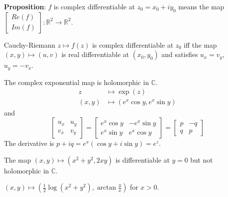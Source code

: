 \documentclass{report}
\begin{document}
\textbf{Proposition}: $f$ is complex differentiable at $z_{0} = x_{0} + iy_{0}$ means the map $\begin{bmatrix}
    Re(f) \\
    Im(f)   
\end{bmatrix} : \mathbb{R}^{2} \rightarrow \mathbb{R}^{2}$. 

\begin{theorem}{Cauchy-Riemann}
    $z \mapsto f(z)$ is complex differentiable at $z_{0}$ iff the map $(x, y) \mapsto(u , v)$ is real differentiable at $(x_{0}, y_{0})$ and satisfies $u_{x} = v_{y}$, $u_{y} = -v_{x}$. 
\end{theorem}

\begin{examples}
    \begin{example}
        The complex exponential map is holomorphic in $\mathbb{C}$. 
            \begin{align*}
                z      &\mapsto \exp(z)                      \\
                (x, y) &\mapsto (e^{x}\cos{y}, e^{x}\sin{y})   
            \end{align*}
        and
            \begin{equation*}
                \begin{bmatrix}
                    u_{x} & u_{y} \\
                    v_{x} & v_{y}   
                \end{bmatrix} = \begin{bmatrix}
                    e^{x}\cos{y} & -e^{x}\sin{y} \\
                    e^{x}\sin{y} & e^{x}\cos{y}    
                \end{bmatrix} = \begin{bmatrix}
                    p & -q \\
                    q & p    
                \end{bmatrix}
            \end{equation*}
        The derivative is $p + iq = e^{x}(\cos{y} + i\sin{y}) = e^{z}$.
    \end{example}
    \begin{example}
        The map $(x, y) \mapsto (x^{2} + y^{2}, 2xy)$ is differentiable at $y = 0$ but not holomorphic in $\mathbb{C}$.
    \end{example}
    \begin{example}
        $(x, y) \mapsto (\frac{1}{2}\mathop{log}(x^{2} + y^{2}), \mathop{arctan}\frac{y}{x})$ for $x > 0$.
    \end{example}
\end{examples}
\end{document}
